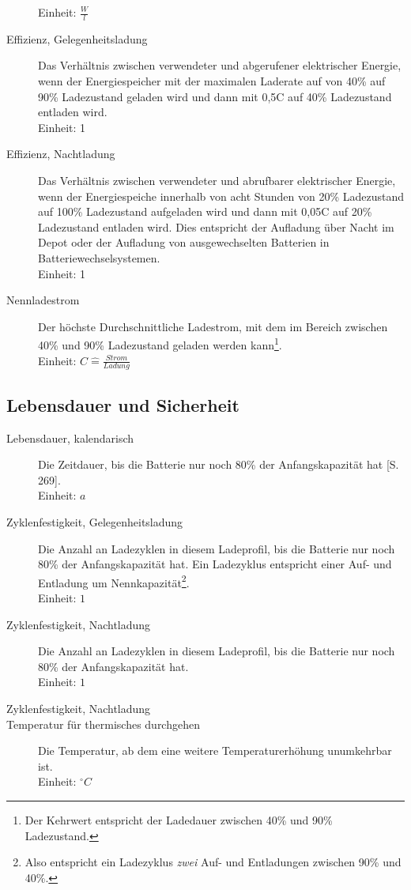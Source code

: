 \begin{description}
	Einheit: $\frac{W}{l}$
	\item[Effizienz, Gelegenheitsladung] Das Verhältnis zwischen verwendeter und abgerufener elektrischer Energie, wenn der Energiespeicher mit der maximalen Laderate auf von 40\% auf 90\% Ladezustand geladen wird und dann mit 0,5C auf 40\% Ladezustand entladen wird.\\
	Einheit: 1
	\item[Effizienz, Nachtladung] Das Verhältnis zwischen verwendeter und abrufbarer elektrischer Energie, wenn der Energiespeiche innerhalb von acht Stunden von 20\% Ladezustand auf 100\% Ladezustand aufgeladen wird und dann mit 0,05C auf 20\% Ladezustand entladen wird. Dies entspricht der Aufladung über Nacht im Depot oder der Aufladung von ausgewechselten Batterien in Batteriewechselsystemen.\\
	Einheit: 1
	\item[Nennladestrom] Der höchste Durchschnittliche Ladestrom, mit dem im Bereich zwischen 40\% und 90\% Ladezustand geladen werden kann\footnote{Der Kehrwert entspricht der Ladedauer zwischen 40\% und 90\% Ladezustand.}.\\
	Einheit: $C\hat{=} \frac{Strom}{Ladung}$
\end{description}

\subsection{Lebensdauer und Sicherheit}
\begin{description}
	\item[Lebensdauer, kalendarisch] Die Zeitdauer, bis die Batterie nur noch 80\% der Anfangskapazität hat \cite{Sterner:2014}[S. 269]. \\
	Einheit: $a$
	\item[Zyklenfestigkeit, Gelegenheitsladung] Die Anzahl an Ladezyklen in diesem Ladeprofil, bis die Batterie nur noch 80\% der Anfangskapazität hat. Ein Ladezyklus entspricht einer Auf- und Entladung um Nennkapazität\footnote{Also entspricht ein Ladezyklus \emph{zwei} Auf- und Entladungen zwischen 90\% und 40\%.}.\\
	Einheit: $1$
	\item[Zyklenfestigkeit, Nachtladung] Die Anzahl an Ladezyklen in diesem Ladeprofil, bis die Batterie nur noch 80\% der Anfangskapazität hat.\\
	Einheit: $1$
	\item[Zyklenfestigkeit, Nachtladung] 
	\item[Temperatur für thermisches durchgehen] Die Temperatur, ab dem eine weitere Temperaturerhöhung unumkehrbar ist.\\
	Einheit: $^\circ C$
\end{description}

